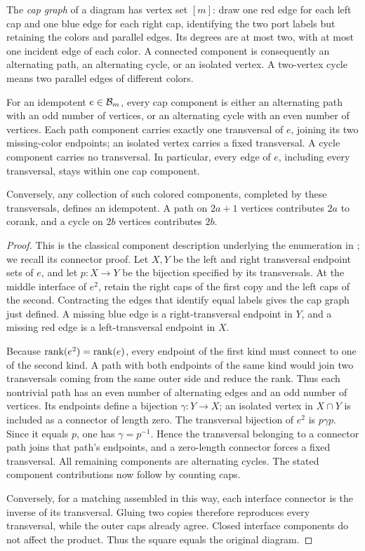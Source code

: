 The \emph{cap graph} of a diagram has vertex set $[m]$: draw one red
edge for each left cap and one blue edge for each right cap, identifying
the two port labels but retaining the colors and parallel edges.
Its degrees are at most two, with at most one incident edge of each
color. A connected component is consequently an alternating path,
an alternating cycle, or an isolated vertex. A two-vertex cycle means
two parallel edges of different colors.

\begin{lemma}\label{btc:alg:components}
For an idempotent $e\in\mathcal{B}_{m}$, every cap component is either an
alternating path with an odd number of vertices, or an alternating
cycle with an even number of vertices. Each path component carries
exactly one transversal of $e$, joining its two missing-color
endpoints; an isolated vertex carries a fixed transversal. A cycle
component carries no transversal. In particular, every edge of $e$,
including every transversal, stays within one cap component.

Conversely, any collection of such colored components, completed by
these transversals, defines an idempotent. A path on $2a+1$ vertices
contributes $2a$ to corank, and a cycle on $2b$ vertices contributes
$2b$.
\end{lemma}

\begin{proof}
This is the classical component description underlying the enumeration
in \cite{Dolinka2015}; we recall its connector proof. Let $X,Y$ be the
left and right transversal endpoint sets of $e$, and let $p:X\to Y$
be the bijection specified by its transversals. At the middle interface
of $e^2$, retain the right caps of the first copy and the left caps of
the second. Contracting the edges that identify equal labels gives
the cap graph just defined. A missing blue edge is a right-transversal
endpoint in $Y$, and a missing red edge is a left-transversal endpoint
in $X$.

Because $\operatorname{rank}(e^2)=\operatorname{rank}(e)$, every endpoint of the first kind must
connect to one of the second kind. A path with both endpoints of the
same kind would join two transversals coming from the same outer
side and reduce the rank. Thus each nontrivial path has an even
number of alternating edges and an odd number of vertices. Its
endpoints define a bijection $\gamma:Y\to X$; an isolated vertex in
$X\cap Y$ is included as a connector of length zero. The transversal
bijection of $e^2$ is $p\gamma p$. Since it equals $p$, one has
$\gamma=p^{-1}$. Hence the transversal belonging to a connector path
joins that path's endpoints, and a zero-length connector forces a
fixed transversal. All remaining components are alternating cycles.
The stated component contributions now follow by counting caps.

Conversely, for a matching assembled in this way, each interface
connector is the inverse of its transversal. Gluing two copies
therefore reproduces every transversal, while the outer caps already
agree. Closed interface components do not affect the product. Thus
the square equals the original diagram.
\end{proof}

